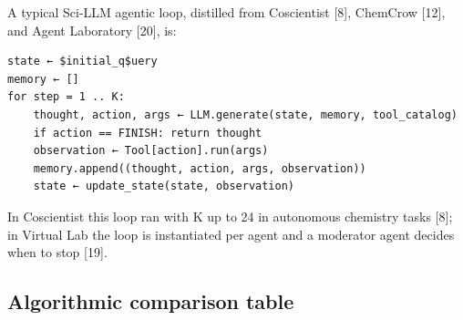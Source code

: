 A typical Sci-LLM agentic loop, distilled from Coscientist {[}8{]}, ChemCrow {[}12{]}, and Agent Laboratory {[}20{]}, is:

\begin{verbatim}
state ← $initial_q$uery
memory ← []
for step = 1 .. K:
    thought, action, args ← LLM.generate(state, memory, tool_catalog)
    if action == FINISH: return thought
    observation ← Tool[action].run(args)
    memory.append((thought, action, args, observation))
    state ← update_state(state, observation)
\end{verbatim}

In Coscientist this loop ran with K up to 24 in autonomous chemistry tasks {[}8{]}; in Virtual Lab the loop is instantiated per agent and a moderator agent decides when to stop {[}19{]}.

\subsection{Algorithmic comparison table}\label{algorithmic-comparison-table}

